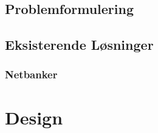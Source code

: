 \section{Problemformulering}


\section{Eksisterende Løsninger}
\subsection{Netbanker}


%

\chapter{Design}






